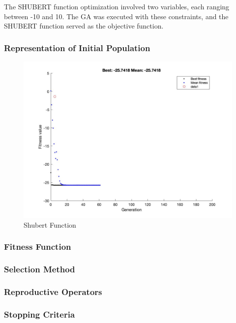 \documentclass[conference]{inc/IEEEtran}
\begin{document}
The SHUBERT function optimization involved two variables, each ranging between -10 and 10. The GA was executed with these constraints, and the SHUBERT function served as the objective function. 


\subsubsection{Representation of Initial Population}

\begin{figure}
    \includegraphics[width=\linewidth]{figures/shubert.jpg}
    \caption{Shubert Function}
    \label{fig:boat1}
  \end{figure}

\subsubsection{Fitness Function}

\subsubsection{Selection Method}

\subsubsection{Reproductive Operators}

\subsubsection{Stopping Criteria}
\end{document}
